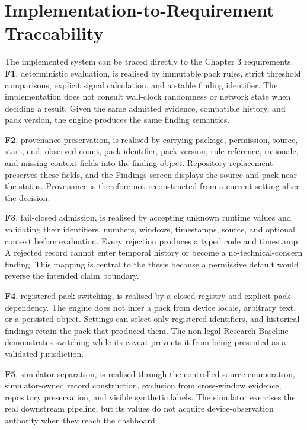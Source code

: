 \section{Implementation-to-Requirement Traceability}

The implemented system can be traced directly to the Chapter 3 requirements. \textbf{F1}, deterministic evaluation, is realised by immutable pack rules, strict threshold comparisons, explicit signal calculation, and a stable finding identifier. The implementation does not consult wall-clock randomness or network state when deciding a result. Given the same admitted evidence, compatible history, and pack version, the engine produces the same finding semantics.

\textbf{F2}, provenance preservation, is realised by carrying package, permission, source, start, end, observed count, pack identifier, pack version, rule reference, rationale, and missing-context fields into the finding object. Repository replacement preserves these fields, and the Findings screen displays the source and pack near the status. Provenance is therefore not reconstructed from a current setting after the decision.

\textbf{F3}, fail-closed admission, is realised by accepting unknown runtime values and validating their identifiers, numbers, windows, timestamps, source, and optional context before evaluation. Every rejection produces a typed code and timestamp. A rejected record cannot enter temporal history or become a no-technical-concern finding. This mapping is central to the thesis because a permissive default would reverse the intended claim boundary.

\textbf{F4}, registered pack switching, is realised by a closed registry and explicit pack dependency. The engine does not infer a pack from device locale, arbitrary text, or a persisted object. Settings can select only registered identifiers, and historical findings retain the pack that produced them. The non-legal Research Baseline demonstrates switching while its caveat prevents it from being presented as a validated jurisdiction.

\textbf{F5}, simulator separation, is realised through the controlled source enumeration, simulator-owned record construction, exclusion from cross-window evidence, repository preservation, and visible synthetic labels. The simulator exercises the real downstream pipeline, but its values do not acquire device-observation authority when they reach the dashboard.

